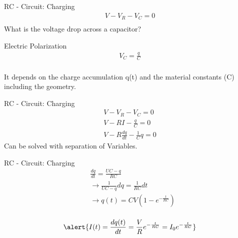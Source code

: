 \begin{frame}
  \begin{PointSix}{RC - Circuit: Charging}
  \begin{eqnarray*}
    V - V_R - V_C = 0 \\
   \end{eqnarray*}
   \small
    What is the voltage drop across a capacitor? 
  \end{PointSix}
\end{frame}

\begin{frame}
  \begin{PointSix}{Electric Polarization}
    \begin{eqnarray*}
      V_C = \frac{q}{C} \\
     \end{eqnarray*}
   \begin{center}
    \small
    It depends on the charge accumulation q(t) and the material constants (C) including the geometry.
   \end{center}
  \end{PointSix}
\end{frame}

\begin{frame}{RC - Circuit: Charging}
  \begin{eqnarray*}
    V - V_R - V_C = 0 \\
    V - RI - \frac{q}{C} = 0 \\
    V - R\frac{dq}{dt}-\frac{1}{C}q = 0  
  \end{eqnarray*}
  \small
  Can be solved with separation of Variables.

\end{frame}

\begin{frame}{RC - Circuit: Charging}
  \begin{eqnarray*}
    &\frac{dq}{dt} = \frac{UC - q}{RC} \\
    &\rightarrow \frac{1}{UC-q}dq = \frac{1}{RC} dt \\
    &\rightarrow q(t) = CV(1-e^{-\frac{t}{RC}}) \\
  \end{eqnarray*}

  \begin{equation}
    \alert{I(t) = \frac{dq(t)}{dt}=\frac{V}{R}e^{-\frac{t}{RC}}=I_0e^{-\frac{t}{RC}}} 
  \end{equation}


\end{frame}

